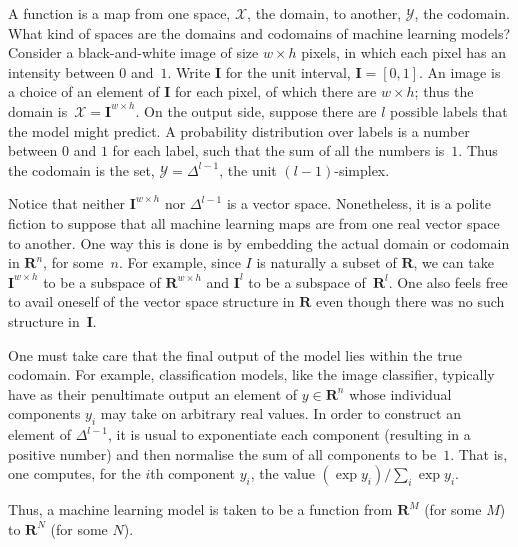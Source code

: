 \documentclass{article}
\newcommand{\set}[1]{\mathbf{#1}}
\begin{document}
A function is a map from one space, $\mathcal{X}$, the domain, to another,
$\mathcal{Y}$, the codomain.  What kind of spaces are the domains and codomains
of machine learning models?  Consider a black-and-white image of size
$w\times h$ pixels, in which each pixel has an intensity between $0$
and~$1$.  Write $\set{I}$ for the unit interval, $\set{I}=[0,1]$.  An
image is a choice of an element of $\set{I}$ for each pixel, of which
there are $w\times h$; thus the domain
is~$\mathcal{X}=\set{I}^{w\times h}$.  On the output side, suppose there are
$l$ possible labels that the model might predict.  A probability
distribution over labels is a number between $0$ and $1$ for each
label, such that the sum of all the numbers is~$1$.  Thus the codomain
is the set, $\mathcal{Y}= \Delta^{l-1}$, the unit
$(l-1)$-simplex.

Notice that neither $\set{I}^{w\times h}$ nor $\Delta^{l-1}$ is a vector
space.
Nonetheless, it is a polite fiction to suppose that all machine
learning maps are from one real vector space to another.  One way this
is done is by embedding the actual domain or codomain in $\set{R}^n$,
for some~$n$.  For example, since $I$ is naturally a subset of
$\set{R}$, we can take $\set{I}^{w\times h}$ to be a subspace of
$\set{R}^{w\times h}$ and $\set{I}^l$ to be a subspace of~$\set{R}^l$.  One
also feels free to avail oneself of the vector space structure in
$\set{R}$ even though there was no such structure in~$\set{I}$.

One must take care that the final output of the model lies within the
true codomain.  For example, classification models, like the image
classifier, typically have as their penultimate output an element of
$y\in\set{R}^n$ whose individual components $y_i$ may take on arbitrary
real values.  In order to construct an element of $\Delta^{l-1}$, it is
usual to exponentiate each component (resulting in a positive number)
and then normalise the sum of all components to be~$1$.  That is, one
computes, for the $i$th component $y_i$, the value
$(\exp {y_i})/ \sum_i \exp {y_i}$.

Thus, a machine learning model is taken to be a function from
$\set{R}^M$ (for some $M$) to $\set{R}^N$ (for some $N$).
\end{document}
